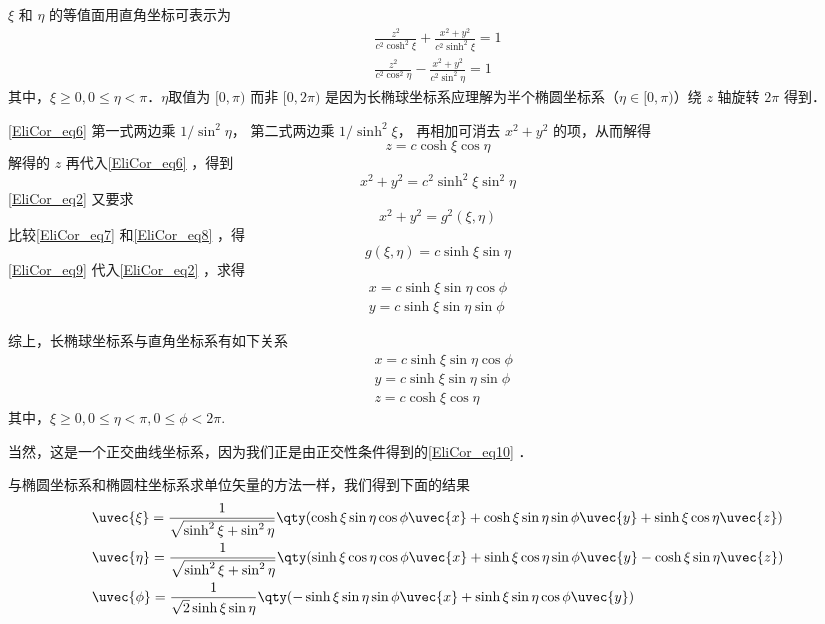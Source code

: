 $\xi$ 和 $\eta$ 的等值面用直角坐标可表示为
\begin{equation}\label{EliCor_eq6}
\begin{aligned}
\frac{z^2}{c^2\cosh^2\xi}+\frac{x^2+y^2}{c^2\sinh^2\xi}=1\\
\frac{z^2}{c^2\cos^2\eta}-\frac{x^2+y^2}{c^2\sin^2\eta}=1
\end{aligned}
\end{equation}
其中，$\xi\geq 0,0\leq\eta<\pi$．$\eta$取值为 $[0,\pi)$ 而非 $[0,2\pi)$ 是因为长椭球坐标系应理解为半个椭圆坐标系（$\eta\in[0,\pi)$）绕 $z$ 轴旋转 $2\pi$ 得到．

\autoref{EliCor_eq6} 第一式两边乘 $1/\sin^2\eta$， 第二式两边乘 $1/\sinh^2\xi$， 再相加可消去 $x^2+y^2$ 的项，从而解得
\begin{equation}
z=c\cosh\xi\cos\eta
\end{equation}
解得的 $z$ 再代入\autoref{EliCor_eq6} ，得到
\begin{equation}\label{EliCor_eq7}
x^2+y^2=c^2\sinh^2\xi\sin^2\eta
\end{equation}
\autoref{EliCor_eq2} 又要求
\begin{equation}\label{EliCor_eq8}
x^2+y^2=g^2(\xi,\eta)
\end{equation}
比较\autoref{EliCor_eq7} 和\autoref{EliCor_eq8} ，得
\begin{equation}\label{EliCor_eq9}
g(\xi,\eta)=c\sinh\xi\sin\eta
\end{equation}
\autoref{EliCor_eq9} 代入\autoref{EliCor_eq2} ，求得
\begin{equation}
\begin{aligned}
x=c\sinh\xi\sin\eta\cos\phi\\
y=c\sinh\xi\sin\eta\sin\phi
\end{aligned}
\end{equation}

综上，长椭球坐标系与直角坐标系有如下关系
\begin{equation}\label{EliCor_eq10}
\begin{aligned}
&x=c\sinh\xi\sin\eta\cos\phi\\
&y=c\sinh\xi\sin\eta\sin\phi\\
&z=c\cosh\xi\cos\eta
\end{aligned}
\end{equation}
其中，$\xi\geq 0,0\leq\eta<\pi,0\leq\phi<2\pi$.

当然，这是一个正交曲线坐标系，因为我们正是由正交性条件得到的\autoref{EliCor_eq10} ．

与椭圆坐标系和椭圆柱坐标系求单位矢量的方法一样，我们得到下面的结果
\begin{equation}
\begin{aligned}
&\uvec{\xi}=\frac{1}{\sqrt{\sinh^2\xi+\sin^2\eta}}\qty(\cosh\xi\sin\eta\cos\phi\uvec{x}+\cosh\xi\sin\eta\sin\phi\uvec{y}+\sinh\xi\cos\eta\uvec{z})\\
&\uvec{\eta}=\frac{1}{\sqrt{\sinh^2\xi+\sin^2\eta}}\qty(\sinh\xi\cos\eta\cos\phi\uvec{x}+\sinh\xi\cos\eta\sin\phi\uvec{y}-\cosh\xi\sin\eta\uvec{z})\\
&\uvec{\phi}=\frac{1}{\sqrt{2}\sinh\xi\sin\eta}\qty(-\sinh\xi\sin\eta\sin\phi\uvec{x}+\sinh\xi\sin\eta\cos\phi\uvec{y})
\end{aligned}
\end{equation}
